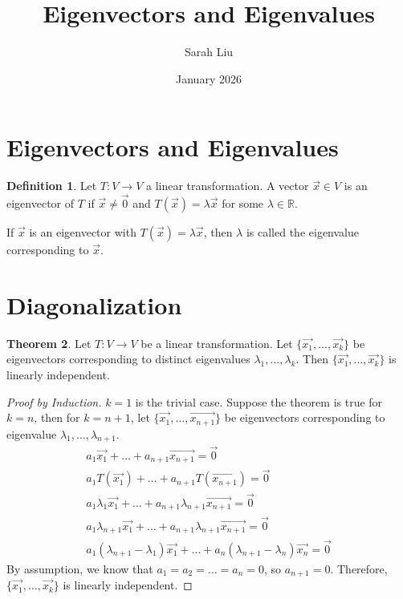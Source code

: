 \documentclass{article}
\title{Eigenvectors and Eigenvalues}
\author{Sarah Liu}
\date{January 2026}
\theoremstyle{definition}
\newtheorem{theorem}{Theorem}[section]
\newtheorem{definition}[theorem]{Definition}
\theoremstyle{remark}
\begin{document}
\maketitle

\section{Eigenvectors and Eigenvalues}

\begin{definition}
    Let $T:V\rightarrow V$ a linear transformation.
    A vector $\vec{x}\in V$ is an eigenvector of $T$ if $\vec{x}\neq\vec{0}$ and $T(\vec{x})=\lambda \vec{x}$ for some $\lambda\in \mathbb{R}$.

    If $\vec{x}$ is an eigenvector with $T(\vec{x})=\lambda \vec{x}$, then $\lambda$ is called the eigenvalue corresponding to $\vec{x}$.
\end{definition}

\section{Diagonalization}

\begin{theorem}
    Let $T:V\rightarrow V$ be a linear transformation.
    Let $\{\vec{x_1},\dots, \vec{x_k}\}$ be eigenvectors corresponding to distinct eigenvalues $\lambda_1, \dots,\lambda_k$.
    Then $\{\vec{x_1},\dots, \vec{x_k}\}$ is linearly independent.
\end{theorem}

\begin{proof}[Proof by Induction]
    $k=1$ is the trivial case.
    Suppose the theorem is true for $k=n$, then for $k=n+1$, let $\{\vec{x_1},\dots, \vec{x_{n+1}}\}$ be eigenvectors corresponding to eigenvalue $\lambda_1, \dots,\lambda_{n+1}$.
    \[
    \begin{aligned}
    a_1\vec{x_1}+\dots+a_{n+1}\vec{x_{n+1}}=\vec{0}\\
    a_1T(\vec{x_1})+\dots+a_{n+1}T(\vec{x_{n+1}})=\vec{0}\\
    a_1\lambda_1\vec{x_1}+\dots+a_{n+1}\lambda_{n+1}\vec{x_{n+1}}=\vec{0}\\
    a_1\lambda_{n+1}\vec{x_1}+\dots+a_{n+1}\lambda_{n+1}\vec{x_{n+1}}=\vec{0}\\
    a_1(\lambda_{n+1}-\lambda_1)\vec{x_1}+\dots+a_{n}(\lambda_{n+1}-\lambda_{n})\vec{x_{n}}=\vec{0}
    \end{aligned}
    \]
    By assumption, we know that $a_1=a_2=\dots=a_n=0$, so $a_{n+1}=0$. 
    Therefore, $\{\vec{x_1},\dots, \vec{x_k}\}$ is linearly independent.
\end{proof}
\end{document}
